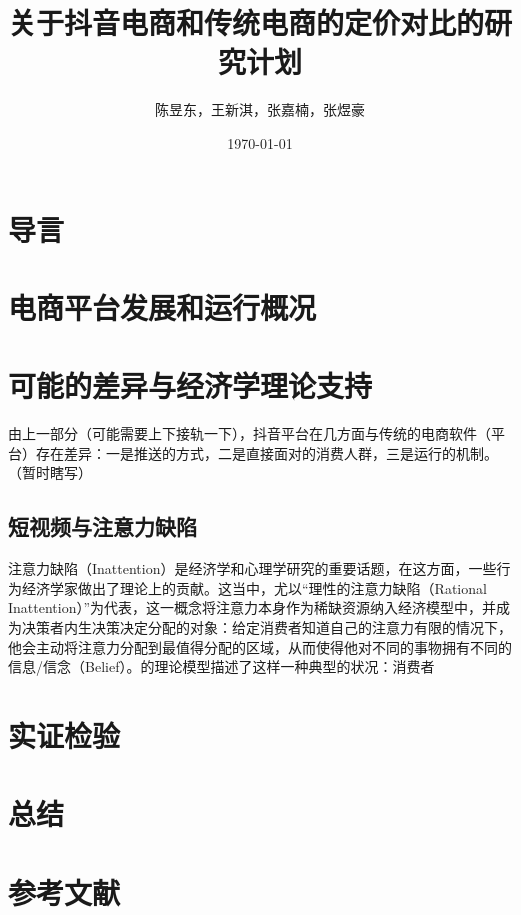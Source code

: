 \documentclass[11pt]{article}
\author{陈昱东，王新淇，张嘉楠，张煜豪}
\title{\textbf{关于抖音电商和传统电商的定价对比的研究计划}}
\date{\today}
\begin{document}
\maketitle

\section{导言}

\section{电商平台发展和运行概况}

\section{可能的差异与经济学理论支持}

由上一部分（可能需要上下接轨一下），抖音平台在几方面与传统的电商软件（平台）存在差异：一是推送的方式，二是直接面对的消费人群，三是运行的机制。（暂时瞎写）

\subsection{短视频与注意力缺陷}

注意力缺陷（Inattention）是经济学和心理学研究的重要话题，在这方面，一些行为经济学家做出了理论上的贡献。这当中，尤以“理性的注意力缺陷（Rational Inattention）”为代表，这一概念将注意力本身作为稀缺资源纳入经济模型中，并成为决策者内生决策决定分配的对象：给定消费者知道自己的注意力有限的情况下，他会主动将注意力分配到最值得分配的区域，从而使得他对不同的事物拥有不同的信息/信念（Belief）。\citet{moraga-gonzalezPricesHeterogeneousSearch2017}的理论模型描述了这样一种典型的状况：消费者

\section{实证检验}

\section{总结}

\clearpage
\section*{参考文献}


\end{document}
